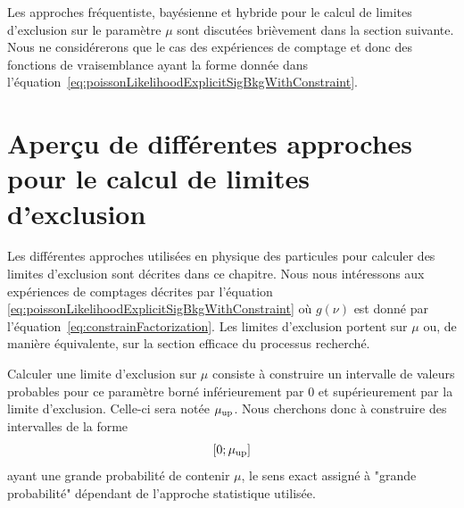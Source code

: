 Les approches fréquentiste, bayésienne et hybride pour le calcul de limites d'exclusion sur le paramètre $\mu$ sont discutées brièvement dans la section suivante. Nous ne considérerons que le cas des expériences de comptage et donc des fonctions de vraisemblance ayant la forme donnée dans l'équation~\ref{eq:poissonLikelihoodExplicitSigBkgWithConstraint}. 

%

\section{Aper\c cu de différentes approches pour le calcul de limites d'exclusion}

Les diff\'erentes approches utilis\'ees en physique des particules pour calculer des limites d'exclusion sont d\'ecrites dans ce chapitre. Nous nous int\'eressons aux exp\'eriences de comptages d\'ecrites par l'\'equation \ref{eq:poissonLikelihoodExplicitSigBkgWithConstraint} o\`u $g\left(\nu\right)$ est donn\'e par l'équation~\ref{eq:constrainFactorization}. Les limites d'exclusion portent sur $\mu$ ou, de mani\`ere \'equivalente, sur la section efficace du processus recherch\'e.
 
Calculer une limite d'exclusion sur $\mu$ consiste \`a construire un intervalle de valeurs probables pour ce param\`etre born\'e inf\'erieurement par 0 et sup\'erieurement par la limite d'exclusion. Celle-ci sera not\'ee $\mu_{\text{up}}$. Nous cherchons donc \`a construire des intervalles de la forme 
\begin{equation}
\label{eq:limitInterval}
\left[0;\mu_{\text{up}}\right]
\end{equation}
ayant une grande probabilit\'e de contenir $\mu$, le sens exact assign\'e \`a "grande probabilit\'e" d\'ependant de l'approche statistique utilis\'ee.

